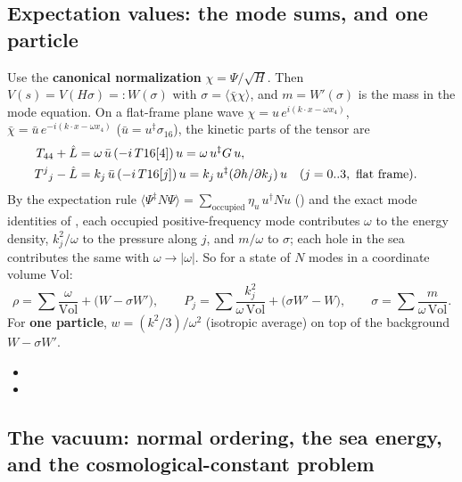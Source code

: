 \subsection{Expectation values: the mode sums, and one particle}
\label{sec:8.2}

Use the \textbf{canonical normalization} $\chi=\Psi/\sqrt H$. Then $V(s)=V(H\sigma)=:W(\sigma)$ with
$\sigma=\langle\bar\chi\chi\rangle$, and $m=W'(\sigma)$ is the mass in the mode equation. On a
flat-frame plane wave $\chi=u\,e^{i(k\cdot x-\omega x_4)}$, $\bar\chi=\bar u\,e^{-i(k\cdot x-\omega x_4)}$
($\bar u=u^{\ddagger}\sigma_{16}$), the kinetic parts of the tensor are
\begin{align*}
  T_{44}+\hat L&=\omega\,\bar u\,(-i\,T16[4])\,u=\omega\,u^{\ddagger}G\,u,\\
  T^j{}_j-\hat L&=k_j\,\bar u\,(-i\,T16[j])\,u=k_j\,u^{\ddagger}(\partial h/\partial k_j)\,u &&(j=0..3,\text{ flat frame}).
\end{align*}
By the expectation rule
$\langle\Psi^{\ddagger}N\Psi\rangle=\sum_{\text{occupied}}\eta_u\,u^{\dagger}Nu$ () and
the exact mode identities of , each occupied positive-frequency mode contributes
$\omega$ to the energy density, $k_j^2/\omega$ to the pressure along $j$, and $m/\omega$ to $\sigma$;
each hole in the sea contributes the same with $\omega\to|\omega|$. So for a state of $N$ modes in a
coordinate volume $\mathrm{Vol}$:
\[
  \rho=\sum\frac{\omega}{\mathrm{Vol}}+\bigl(W-\sigma W'\bigr),\qquad
  P_j=\sum\frac{k_j^2}{\omega\,\mathrm{Vol}}+\bigl(\sigma W'-W\bigr),\qquad
  \sigma=\sum\frac{m}{\omega\,\mathrm{Vol}} .
\]
For \textbf{one particle}, $w=(k^2/3)/\omega^2$ (isotropic average) on top of the background
$W-\sigma W'$. 
\begin{itemize}
  \item {}
  \item {}
\end{itemize}

\subsection{The vacuum: normal ordering, the sea energy, and the cosmological-constant problem}
\label{sec:8.3}

